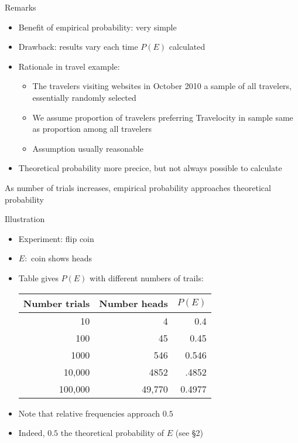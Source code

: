 \documentclass[handout]{beamer}
\theoremstyle{definition}
\begin{document}
\begin{frame}{Remarks}
\begin{itemize}
\item Benefit of empirical probability: very simple
\item Drawback: results vary each time $P\left(E\right)$ calculated
\item Rationale in travel example:
\begin{itemize}
\item The travelers visiting websites in October 2010 a \alert{sample}
of all travelers, essentially \alert{randomly} selected
\item We assume proportion of travelers preferring Travelocity
in sample same as proportion among all travelers
\item Assumption usually reasonable
\end{itemize}
\item Theoretical probability more precice,
but not always possible to calculate
\end{itemize}
\begin{theorem}
As number of trials increases, empirical probability
approaches theoretical probability
\end{theorem}
\end{frame}

\begin{frame}{Illustration}
\begin{itemize}
\item Experiment: flip coin
\item $E:$ coin shows heads
\item Table gives $P\left(E\right)$ with different numbers of trails:
\begin{center}\begin{tabular}{rrr}
Number trials&Number heads&$P\left(E\right)$\\\hline
10&4&0.4\\
100&45&0.45\\
1000&546&0.546\\
10,000&4852&.4852\\
100,000&49,770&0.4977
\end{tabular}\end{center}
\item Note that relative frequencies approach $0.5$
\item Indeed, $0.5$ the theoretical probability of $E$
(see \S2)
\end{itemize}
\end{frame}
\end{document}
